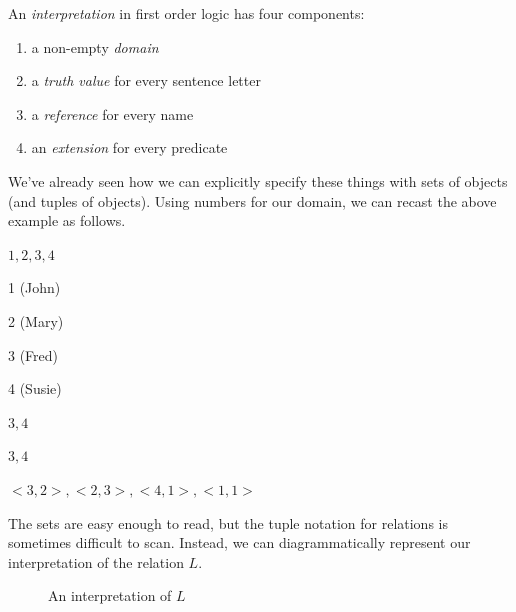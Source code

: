 \begin{definition}
  \label{def:fol-interpretation}
  An \emph{interpretation} in first order logic has four components:\\
  \begin{enumerate}
  \item a non-empty \emph{domain}
  \item a \emph{truth value} for every sentence letter
  \item a \emph{reference} for every name
  \item an \emph{extension} for every predicate
  \end{enumerate}
\end{definition}

We've already seen how we can explicitly specify these things with sets of
objects (and tuples of objects). Using numbers for our domain, we can recast
the above example as follows.

\begin{argument}
  \item[\textbf{D:}] ${1,2,3,4}$
  \item[$j$:] 1 (John)
  \item[$m$:] 2 (Mary)
  \item[$f$:] 3 (Fred)
  \item[$s$:] 4 (Susie)
  \item[$P$:] ${3,4}$
  \item[$E$:] ${3,4}$
  \item[$L$:] ${<3,2>,<2,3>,<4,1>,<1,1>}$
\end{argument}

The sets are easy enough to read, but the tuple notation for relations is
sometimes difficult to scan. Instead, we can diagrammatically represent our
interpretation of the relation $L$.

\begin{figure}[h]
  \centering
  \caption{An interpretation of $L$}
  \label{fig:model-of-love}
\end{figure}

